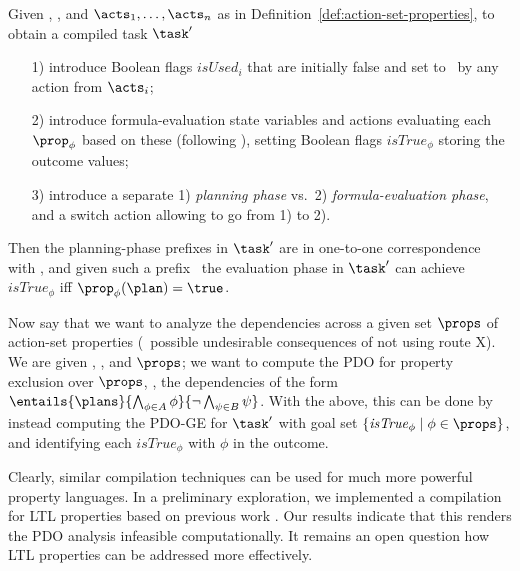 Given \task, \plans, and $\acts_1, \dots, \acts_n$ as in
Definition~\ref{def:action-set-properties}, to obtain a compiled task
$\task'$
\begin{itemize}
\item[1)] introduce Boolean flags $\mathit{isUsed}_i$ that are
  initially false and set to \true\ by any action from $\acts_i$;
\item[2)] introduce formula-evaluation state variables and actions
  evaluating each $\prop_\phi$ based on these (following
  \cite{gazen:knoblock:ecp-97,nebel:jair-00}), setting Boolean flags
  $\mathit{isTrue}_\phi$ storing the outcome values;
\item[3)] introduce a separate 1) \emph{planning phase} vs.\ 2)
  \emph{formula-evaluation phase}, and a switch action allowing to go
  from 1) to 2).
\end{itemize}
Then the planning-phase prefixes in $\task'$ are in one-to-one
correspondence with \plans, and given such a prefix \plan\ the
evaluation phase in $\task'$ can achieve $\mathit{isTrue}_\phi$ iff
$\prop_\phi(\plan) = \true$.

Now say that we want to analyze the dependencies across a given set
$\props$ of action-set properties (\eg\ possible undesirable
consequences of not using route X). We are given \task, \plans, and
$\props$; we want to compute the PDO for property exclusion over
$\props$, \ie, the dependencies of the form
$\entails{\plans}{\bigwedge_{\phi \in A} \phi}{\neg \bigwedge_{\psi
    \in B} \psi}$. With the above, this can be done by instead
computing the PDO-GE for $\task'$ with goal set
$\{\mathit{isTrue}_\phi \mid \phi \in \props\}$, and identifying each
$\mathit{isTrue}_\phi$ with $\phi$ in the outcome.

Clearly, similar compilation techniques can be used for much more
powerful property languages. In a preliminary exploration, we
implemented a compilation for LTL properties based on previous work
\cite{edelkamp:icaps-06,baier:etal:ai-09}. Our results indicate that
this renders the PDO analysis infeasible computationally. It remains
an open question how LTL properties can be addressed more effectively.






